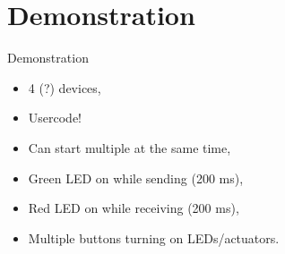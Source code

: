 \section{Demonstration}
    \begin{frame}[t]{Demonstration}
        \begin{itemize}
            \item 4 (?) devices,
            \item Usercode!
            \item Can start multiple at the same time,
            \item Green LED on while sending (200 ms),
            \item Red LED on while receiving (200 ms),
            \item Multiple buttons turning on LEDs/actuators.
        \end{itemize}
    \end{frame}
